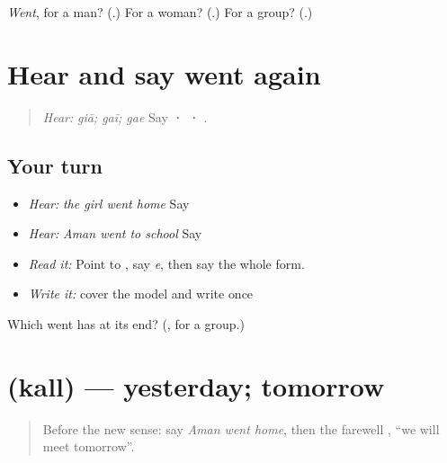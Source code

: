 \begin{tcolorbox}[breakable,colback=teal!4,colframe=teal!35!black,title={Before you move on}]
\emph{Went}, for a man? (\textbf{}.) For a woman? (\textbf{}.) For a group? (\textbf{}.)
\end{tcolorbox}
\section[\texorpdfstring{\pa{ਗਿਆ} · \pa{ਗਈ} · \pa{ਗਏ} (giā · gaī · gae)}{ਗਿਆ · ਗਈ · ਗਏ (giā · gaī · gae)}]{Hear and say went again}

\label{lesson:PA-C216-gia-review}



\begin{quote}
\emph{Hear:} \emph{giā; gaī; gae} Say \textbf{ ·  · }.
\end{quote}

\subsection*{Your turn}
\begin{itemize}
\raggedright
  \item \emph{Hear:} \emph{the girl went home} Say \textbf{  }
  \item \emph{Hear:} \emph{Aman went to school} Say \textbf{  }
  \item \emph{Read it:} \textbf{} Point to \textbf{}, say \emph{e}, then say the whole form.
  \item \emph{Write it:} cover the model and write \textbf{} once
\end{itemize}

\begin{tcolorbox}[breakable,colback=teal!4,colframe=teal!35!black,title={Before you move on}]
Which went has \textbf{} at its end? (\textbf{}, for a group.)
\end{tcolorbox}
\section[\texorpdfstring{\pa{ਕੱਲ੍ਹ} (kallh)}{ਕੱਲ੍ਹ (kallh)}]{ (kall) — yesterday; tomorrow}

\label{lesson:PA-C216-kall}



\begin{quote}
Before the new sense: say \emph{Aman went home}, then the farewell \textbf{ }, \textquotedblleft{}we will meet tomorrow\textquotedblright{}.
\end{quote}

